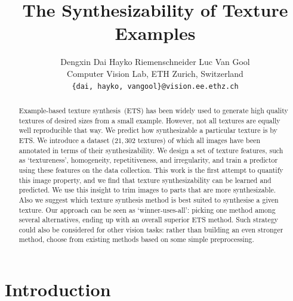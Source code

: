 \documentclass[10pt,twocolumn,letterpaper]{article}
\begin{document}
\title{ The Synthesizability of Texture Examples}
\author{Dengxin Dai \quad Hayko Riemenschneider \quad Luc Van Gool\\
Computer Vision Lab, ETH Zurich, Switzerland\\
{\tt\small \{dai, hayko, vangool\}@vision.ee.ethz.ch}
}

\maketitle

\begin{abstract}
  
  Example-based texture synthesis~(ETS) has been widely used to
  generate high quality textures of desired sizes from a small
  example. However, not all textures are equally well reproducible
  that way. We predict how synthesizable a particular texture
  is by ETS. We introduce a dataset ($21,302$ textures) of
  which all images have been annotated in terms of their
  synthesizability.  We design a set of texture features, such as
  `textureness', homogeneity, repetitiveness, and irregularity, and
  train a predictor using these features on the data collection.  This
  work is the first attempt to quantify this image property, and we
  find that texture synthesizability can be learned and predicted. We
  use this insight to trim images to parts that are more synthesizable.  Also we suggest
  which texture synthesis method is best suited to synthesise a given
  texture. Our approach can be seen as `winner-uses-all': picking one
  method among several alternatives, ending up with an overall
  superior ETS method. Such strategy could also be considered for
  other vision tasks: rather than building an even stronger method,
  choose from existing methods based on some simple preprocessing.

\end{abstract}


\section{Introduction}
\end{document}

